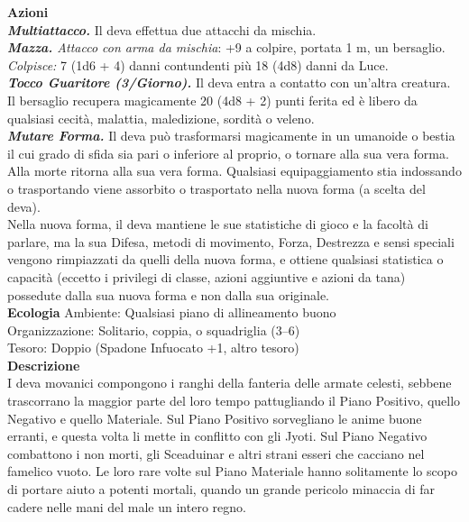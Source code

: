 \begin{multicols}{2}
\smallskip\textbf{Azioni}\\
\emph{\textbf{Multiattacco.}} Il deva effettua due attacchi da mischia.\\
\emph{\textbf{Mazza.} Attacco con arma da mischia}: +9 a colpire, portata 1 m, un bersaglio.\\ 
\emph{Colpisce:} 7 (1d6 + 4) danni contundenti più 18 (4d8) danni da Luce.\\
\emph{\textbf{Tocco Guaritore (3/Giorno).}} Il deva entra a contatto con un'altra creatura. Il bersaglio recupera magicamente 20 (4d8 + 2) punti ferita ed è libero da qualsiasi cecità, malattia, maledizione, sordità o veleno.\\
\emph{\textbf{Mutare Forma.}} Il deva può trasformarsi magicamente in un umanoide o bestia il cui grado di sfida sia pari o inferiore al proprio, o tornare alla sua vera forma. Alla morte ritorna alla sua vera forma. Qualsiasi equipaggiamento stia indossando o trasportando viene assorbito o trasportato nella nuova forma (a scelta del deva).\\
Nella nuova forma, il deva mantiene le sue statistiche di gioco e la facoltà di parlare, ma la sua Difesa, metodi di movimento, Forza, Destrezza e sensi speciali vengono rimpiazzati da quelli della nuova forma, e ottiene qualsiasi statistica o capacità (eccetto i privilegi di classe, azioni aggiuntive e azioni da tana) possedute dalla sua nuova forma e non dalla sua originale.\\
\textbf{Ecologia}
Ambiente: Qualsiasi piano di allineamento buono\\
Organizzazione: Solitario, coppia, o squadriglia (3–6)\\
Tesoro: Doppio (Spadone Infuocato +1, altro tesoro)\\
\textbf{Descrizione}\\
I deva movanici compongono i ranghi della fanteria delle armate celesti, sebbene trascorrano la maggior parte del loro tempo pattugliando il Piano Positivo, quello Negativo e quello Materiale. Sul Piano Positivo sorvegliano le anime buone erranti, e questa volta li mette in conflitto con gli Jyoti. Sul Piano Negativo combattono i non morti, gli Sceaduinar e altri strani esseri che cacciano nel famelico vuoto. Le loro rare volte sul Piano Materiale hanno solitamente lo scopo di portare aiuto a potenti mortali, quando un grande pericolo minaccia di far cadere nelle mani del male un intero regno.\\


\end{multicols}
